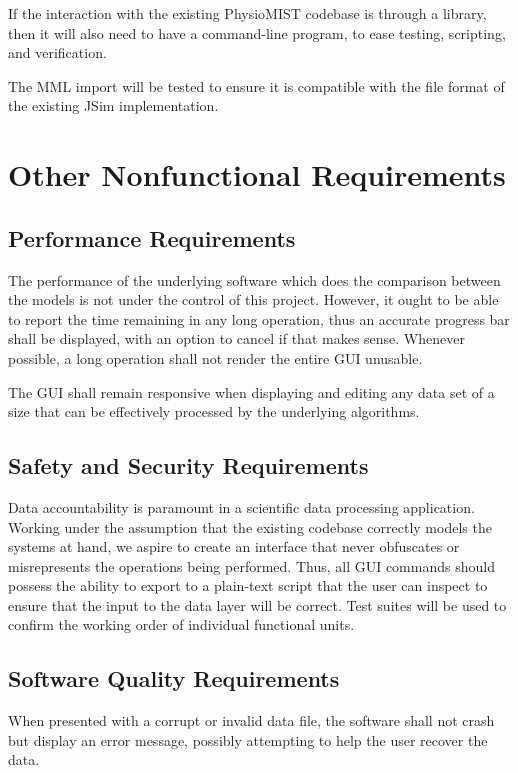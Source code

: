 \documentclass{article}
\begin{document}
If the interaction with the existing PhysioMIST codebase is through a library, then it will also need to have a command-line program, to ease testing, scripting, and verification.

The MML import will be tested to ensure it is compatible with the file format of the existing JSim implementation.

\section{Other Nonfunctional Requirements}
\subsection{Performance Requirements}
The performance of the underlying software which does the comparison between the models is not under the control of this project. However, it ought to be able to report the time remaining in any long operation, thus an accurate progress bar shall be displayed, with an option to cancel if that makes sense. Whenever possible, a long operation shall not render the entire GUI unusable.

The GUI shall remain responsive when displaying and editing any data set of a size that can be effectively processed by the underlying algorithms.

\subsection{Safety and Security Requirements}
Data accountability is paramount in a scientific data processing application. Working under the assumption that the existing codebase correctly models the systems at hand, we aspire to create an interface that never obfuscates or misrepresents the operations being performed. Thus, all GUI commands should possess the ability to export to a plain-text script that the user can inspect to ensure that the input to the data layer will be correct. Test suites will be used to confirm the working order of individual functional units.

\subsection{Software Quality Requirements}

When presented with a corrupt or invalid data file, the software shall not crash but display an error message, possibly attempting to help the user recover the data.
\end{document}
